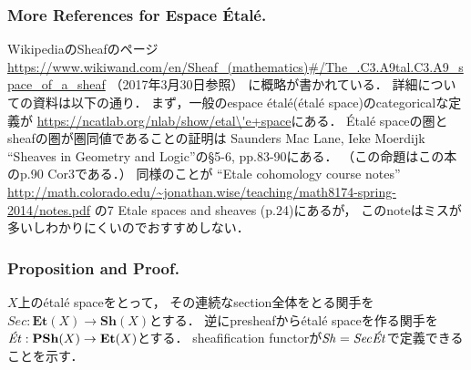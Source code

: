 \documentclass[a4paper]{jsarticle}
\newcommand{\shF}{\mathcal{F}}
\newcommand{\Sh}{\mathbf{Sh}}
\newcommand{\PSh}{\mathbf{PSh}}
\newcommand{\ftorSh}{\mathit{Sh}}
\newcommand{\ftorSec}{\mathit{Sec}}
\newcommand{\ftorEt}{\text{\textit{\'Et}}}
\newcommand{\Spe}{\text{Sp\'e}}
\newcommand{\OpenIn}{\text{ :: open in }}
\begin{document}
    \subsubsection{More References for Espace \'Etal\'e.}
    WikipediaのSheafのページ
    \url{https://www.wikiwand.com/en/Sheaf_(mathematics)#/The_.C3.A9tal.C3.A9_space_of_a_sheaf}
    （2017年3月30日参照）
    に概略が書かれている．
    詳細についての資料は以下の通り．
    まず，一般のespace \'etal\'e(\'etal\'e space)のcategoricalな定義が
    \url{https://ncatlab.org/nlab/show/etal\'e+space}にある．
    \'Etal\'e spaceの圏とsheafの圏が圏同値であることの証明は
    Saunders Mac Lane, Ieke Moerdijk ``Sheaves in Geometry and Logic''の\S5-6, pp.83-90にある．
    （この命題はこの本のp.90 Cor3である．）
    同様のことが
    ``Etale cohomology course notes''
    \url{http://math.colorado.edu/~jonathan.wise/teaching/math8174-spring-2014/notes.pdf}
    の7 Etale spaces and sheaves (p.24)にあるが，
    このnoteはミスが多いしわかりにくいのでおすすめしない．

    \subsubsection{Proposition and Proof.}
    $X$上の\'etal\'e spaceをとって，
    その連続なsection全体をとる関手を$\ftorSec: \mathbf{Et}(X) \to \Sh(X)$とする．
    逆にpresheafから\'etal\'e spaceを作る関手を$\ftorEt: \PSh(X) \to \mathbf{Et}(X)$とする．
    sheafification functorが$\ftorSh=\ftorSec \ftorEt$で定義できることを示す．
\end{document}
